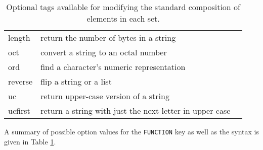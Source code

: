 \documentclass[12pt,a4paper]{article}
\newcommand{\tab}[1]{Table \ref{#1}}
\begin{document}
\begin{table}[!ht]
{\begin{tabular}{lll}
 length&{\rm return the number of bytes in a string}\\
 oct&{\rm convert a string to an octal number}\\
 ord&{\rm find a character's numeric representation}\\
 reverse&{\rm flip a string or a list}\\
 uc&{\rm return upper-case version of a string}\\
 ucfirst&{\rm return a string with just the next letter in upper case}\\
\hline
\end{tabular}
}
\caption{Optional tags available for modifying the standard composition of elements in each set.}
\label{optionalsyntax}
\end{table}
A summary of possible option values for the {\tt FUNCTION} key as well as the syntax is given in \tab{optionalsyntax}.
\end{document}
